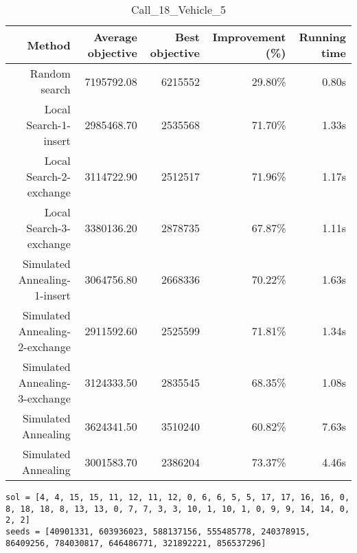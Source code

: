 \begin{table}[ht]
\centering
\caption{Call\_18\_Vehicle\_5}
\label{tab:call18vehicle5}
\begin{tabular}{|r|r|r|r|r|}
Method & Average objective & Best objective & Improvement (\%) & Running time \\
\hline
Random search & 7195792.08 & 6215552 & 29.80\% & 0.80s\\
Local Search-1-insert & 2985468.70 & 2535568 & 71.70\% & 1.33s\\
Local Search-2-exchange & 3114722.90 & 2512517 & 71.96\% & 1.17s\\
Local Search-3-exchange & 3380136.20 & 2878735 & 67.87\% & 1.11s\\
Simulated Annealing-1-insert & 3064756.80 & 2668336 & 70.22\% & 1.63s\\
Simulated Annealing-2-exchange & 2911592.60 & 2525599 & 71.81\% & 1.34s\\
Simulated Annealing-3-exchange & 3124333.50 & 2835545 & 68.35\% & 1.08s\\
Simulated Annealing & 3624341.50 & 3510240 & 60.82\% & 7.63s\\
Simulated Annealing & 3001583.70 & 2386204 & 73.37\% & 4.46s\\
\end{tabular}%
\end{table}
\begin{lstlisting}[label={lst:call18vehicle5},caption=Optimal solution call\_18\_vehicle\_5]
sol = [4, 4, 15, 15, 11, 12, 11, 12, 0, 6, 6, 5, 5, 17, 17, 16, 16, 0, 8, 18, 18, 8, 13, 13, 0, 7, 7, 3, 3, 10, 1, 10, 1, 0, 9, 9, 14, 14, 0, 2, 2]
seeds = [40901331, 603936023, 588137156, 555485778, 240378915, 86409256, 784030817, 646486771, 321892221, 856537296]
\end{lstlisting}%
\clearpage


